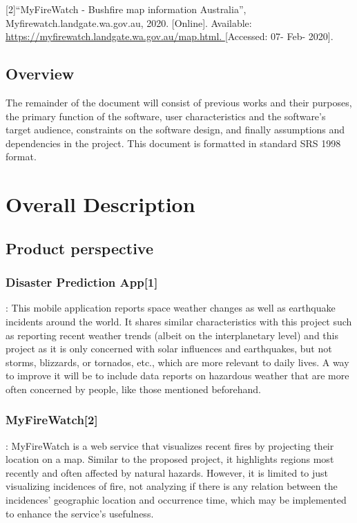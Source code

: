 \documentclass{article}
\begin{document}
[2]“MyFireWatch - Bushfire map information Australia”, Myfirewatch.landgate.wa.gov.au,
 2020. [Online]. Available: \url{ https://myfirewatch.landgate.wa.gov.au/map.html. }
 [Accessed: 07- Feb- 2020].

\subsection{Overview}

The remainder of the document will consist of previous works and 
their purposes, the primary function of the software, user characteristics 
and the software’s target audience, constraints on the software design, 
and finally assumptions and dependencies in the project. This document is 
formatted in standard SRS 1998 format.



\section{Overall Description}
\subsection{Product perspective}
    \subsubsection*{Disaster Prediction App[1]} :
    This mobile application reports space weather changes as well as earthquake 
    incidents around the world. It shares similar characteristics with this 
    project such as reporting recent weather trends (albeit on the interplanetary 
    level) and this project as it is only concerned with solar influences and 
    earthquakes, but not storms, blizzards, or tornados, etc., which are more 
    relevant to daily lives. A way to improve it will be to include data reports on 
    hazardous weather that are more often concerned by people, like those 
    mentioned beforehand.
    \subsubsection*{MyFireWatch[2]} :
    MyFireWatch is a web service that visualizes recent fires by projecting 
    their location on a map. Similar to the proposed project, it highlights 
    regions most recently and often affected by natural hazards. However, it is 
    limited to just visualizing incidences of fire, not analyzing if there is any
    relation between the incidences’ geographic location and occurrence time, 
    which may be implemented to enhance the service’s usefulness.
\end{document}
